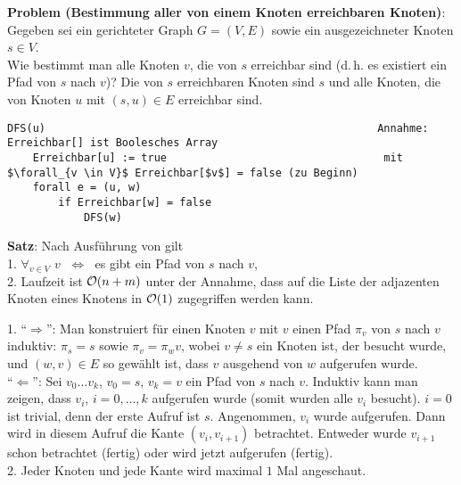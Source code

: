 \textbf{Problem (Bestimmung aller von einem Knoten erreichbaren Knoten)}: \\
Gegeben sei ein gerichteter Graph $G = (V, E)$ sowie ein ausgezeichneter Knoten
$s \in V$. \\
Wie bestimmt man alle Knoten $v$, die von $s$ erreichbar sind
(d.\,h. es existiert ein Pfad von $s$ nach $v$)?
Die von $s$ erreichbaren Knoten sind $s$ und alle Knoten, die von
Knoten $u$ mit $(s, u) \in E$ erreichbar sind.

\begin{lstlisting}
DFS(u)                                                    Annahme: Erreichbar[] ist Boolesches Array
    Erreichbar[u] := true                                  mit $\forall_{v \in V}$ Erreichbar[$v$] = false (zu Beginn)
    forall e = (u, w)
        if Erreichbar[w] = false
            DFS(w)
\end{lstlisting}

\textbf{Satz}: Nach Ausführung von  gilt \\
1. $\forall_{v \in V}$ \code{Erreichbar[}$v$\code{] = true}
$\;\Leftrightarrow\;$ es gibt ein Pfad von $s$ nach $v$, \\
2. Laufzeit ist $\mathcal{O}(n + m)$ unter der Annahme, dass auf die Liste der
adjazenten Knoten eines Knotens in $\mathcal{O}(1)$ zugegriffen werden kann.

\begin{Beweis}
    1. "`$\Rightarrow$"':
    Man konstruiert für einen Knoten $v$ mit
    \code{Erreichbar[}$v$\code{] = true}
    einen Pfad $\pi_v$ von $s$ nach $v$ induktiv:
    $\pi_s = s$ sowie $\pi_v = \pi_w v$, wobei $v \not= s$ ein Knoten ist,
    der besucht wurde, und $(w, v) \in E$ so gewählt ist, dass
    $v$\code{)} ausgehend von $w$\code{)} aufgerufen
    wurde. \\
    "`$\Leftarrow$"':
    Sei $v_0 \dotsc v_k$, $v_0 = s$, $v_k = v$ ein Pfad von $s$ nach $v$.
    Induktiv kann man zeigen, dass $v_i$\code{)}, $i = 0, \dotsc, k$
    aufgerufen wurde (somit wurden alle $v_i$ besucht).
    $i = 0$ ist trivial, denn der erste Aufruf ist $s$\code{)}.
    Angenommen, $v_i$\code{)} wurde aufgerufen.
    Dann wird in diesem Aufruf die Kante $(v_i, v_{i+1})$ betrachtet.
    Entweder wurde $v_{i+1}$ schon betrachtet (fertig) oder wird jetzt
    aufgerufen (fertig). \\
    2. Jeder Knoten und jede Kante wird maximal $1$ Mal angeschaut.
\end{Beweis}

